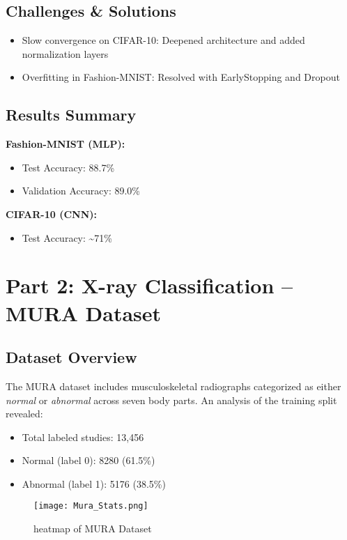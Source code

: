 \documentclass[11pt]{article}
\begin{document}
\subsection*{Challenges \& Solutions}
\begin{itemize}
    \item Slow convergence on CIFAR-10: Deepened architecture and added normalization layers
    \item Overfitting in Fashion-MNIST: Resolved with EarlyStopping and Dropout
\end{itemize}

\subsection*{Results Summary}
\textbf{Fashion-MNIST (MLP):}
\begin{itemize}
    \item Test Accuracy: 88.7\%
    \item Validation Accuracy: 89.0\%
\end{itemize}

\textbf{CIFAR-10 (CNN):}
\begin{itemize}
    \item Test Accuracy: \textasciitilde71\%
\end{itemize}

\section*{Part 2: X-ray Classification -- MURA Dataset}

\subsection*{Dataset Overview}
The MURA dataset includes musculoskeletal radiographs categorized as either \textit{normal} or \textit{abnormal} across seven body parts. An analysis of the training split revealed:
\begin{itemize}
    \item Total labeled studies: 13,456
    \item Normal (label 0): 8280 (61.5\%)
    \item Abnormal (label 1): 5176 (38.5\%)
\end{itemize}

\begin{figure}
    \centering
    \texttt{[image: Mura\_Stats.png]}
    \caption{heatmap of MURA Dataset}
    \label{fig:enter-label}
\end{figure}
\end{document}
